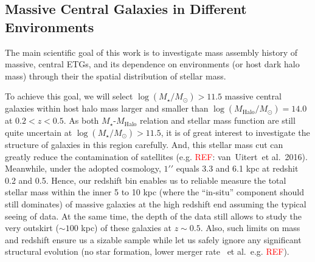 \documentclass[preprint]{aastex}
\def\arcsec{{\prime\prime}}
\def\etal{{\ et al.~}}
\def\logms{$\log (M_{\star}/M_{\odot})$}
\def\logmh{$\log (M_{\mathrm{Halo}}/M_{\odot})$}
\newcommand{\addref}{{\textcolor{red}{REF}}}
\begin{document}
\begin{CJK*}{UTF8}{gbsn}
\subsection{Massive Central Galaxies in Different Environments}

    The main scientific goal of this work is to investigate mass assembly history of
    massive, central ETGs, and its dependence on environments (or host dark halo mass)
    through their the spatial distribution of stellar mass.  
    
    To achieve this goal, we will select \logms$ > 11.5$ massive central galaxies within
    host halo mass larger and smaller than \logmh$= 14.0$ at $0.2 < z < 0.5$.  
    As both $M_{\star}$-$M_{\mathrm{Halo}}$ relation and stellar mass function are still
    quite uncertain at \logms$ > 11.5$, it is of great interest to investigate the
    structure of galaxies in this region carefully.
    And, this stellar mass cut can greatly reduce the contamination of satellites (e.g.
    \addref: van~Uitert\etal 2016).  
    Meanwhile, under the adopted cosmology, $1\arcsec$ equals 3.3 and 6.1 kpc at redshit
    0.2 and 0.5.  
    Hence, our redshift bin enables us to reliable measure the total stellar mass within
    the inner 5 to 10 kpc (where the ``in-situ'' component should still dominates) of
    massive galaxies at the high redshift end assuming the typical seeing of data. 
    At the same time, the depth of the data still allows to study the very outskirt ($\sim
    100$ kpc) of these galaxies at $z\sim 0.5$.  Also, such limits on mass and redshift
    ensure us a sizable sample while let us safely ignore any significant structural
    evolution (no star formation, lower merger rate \etal e.g. \addref). 
        

\end{CJK*}
\end{document}

